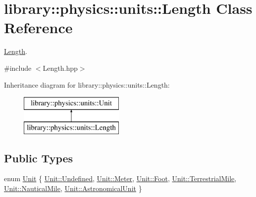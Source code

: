 \hypertarget{classlibrary_1_1physics_1_1units_1_1_length}{}\section{library\+:\+:physics\+:\+:units\+:\+:Length Class Reference}
\label{classlibrary_1_1physics_1_1units_1_1_length}


\hyperlink{classlibrary_1_1physics_1_1units_1_1_length}{Length}.  




{\ttfamily \#include $<$Length.\+hpp$>$}

Inheritance diagram for library\+:\+:physics\+:\+:units\+:\+:Length\+:\begin{figure}[H]
\begin{center}
\leavevmode
\includegraphics[height=2.000000cm]{classlibrary_1_1physics_1_1units_1_1_length}
\end{center}
\end{figure}
\subsection*{Public Types}
\begin{DoxyCompactItemize}
\item 
enum \hyperlink{classlibrary_1_1physics_1_1units_1_1_length_a3b8b39cd245cf6b19dc34459baeccb18}{Unit} \{ \newline
\hyperlink{classlibrary_1_1physics_1_1units_1_1_length_a3b8b39cd245cf6b19dc34459baeccb18aec0fc0100c4fc1ce4eea230c3dc10360}{Unit\+::\+Undefined}, 
\hyperlink{classlibrary_1_1physics_1_1units_1_1_length_a3b8b39cd245cf6b19dc34459baeccb18a17c9c40b9db5a0983d1075a012c1f90a}{Unit\+::\+Meter}, 
\hyperlink{classlibrary_1_1physics_1_1units_1_1_length_a3b8b39cd245cf6b19dc34459baeccb18a129e74dde7b475c8848310e16754c965}{Unit\+::\+Foot}, 
\hyperlink{classlibrary_1_1physics_1_1units_1_1_length_a3b8b39cd245cf6b19dc34459baeccb18af8e05509b5e8ce4f92f380304a29aa87}{Unit\+::\+Terrestrial\+Mile}, 
\newline
\hyperlink{classlibrary_1_1physics_1_1units_1_1_length_a3b8b39cd245cf6b19dc34459baeccb18a17728b6a29127fe1e34706ae1d691f42}{Unit\+::\+Nautical\+Mile}, 
\hyperlink{classlibrary_1_1physics_1_1units_1_1_length_a3b8b39cd245cf6b19dc34459baeccb18aa05a35804c7e4fff8e02f5a58782f133}{Unit\+::\+Astronomical\+Unit}
 \}
\end{DoxyCompactItemize}
